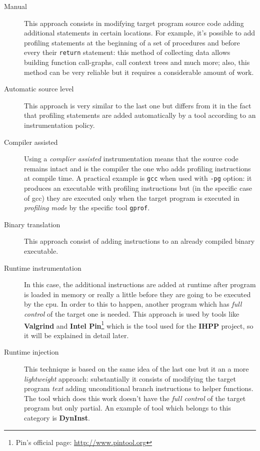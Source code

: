 \documentclass[a4paper,11pt]{report}
\begin{document}
\begin{description}
\begin{description}
\item[Manual]
This approach consists in modifying target program source code adding additional
statements in certain locations. For example, it's possible to add profiling
statements at the beginning of a set of procedures and before every their
\verb|return| statement: this method of collecting data allows building function
call-graphs, call context trees and much more; also, this method can be very
reliable but it requires a considerable amount of work.

\item[Automatic source level] This approach is very similar to the last one but
differs from it in the fact that profiling statements are added automatically by
a tool according to an instrumentation policy.

\item[Compiler assisted] Using a \emph{complier assisted} instrumentation means
that the source code remains intact and is the compiler the one who adds
profiling instructions at compile time. A practical example is \verb|gcc| when
used with \verb|-pg| option: it produces an executable with profiling
instructions but (in the specific case of gcc) they are executed only when the
target program is executed in \emph{profiling mode} by the specific tool
\verb|gprof|.

\item[Binary translation]
This approach consist of adding instructions to an already compiled binary executable.

\item[Runtime instrumentation]
In this case, the additional instructions are added at runtime after program is
loaded in memory or really a little before they are going to be executed by the
cpu. In order to this to happen, another program which has \emph{full control}
of the target one is needed. This approach is used by tools like
\textbf{Valgrind} and \textbf{Intel Pin}\footnote{Pin's official page:
\url{http://www.pintool.org}} which is the tool used for the \textbf{IHPP}
project, so it will be explained in detail later.

\item[Runtime injection] This technique is based on the same idea of the last
one but it an a more \emph{lightweight} approach: substantially it consists of
modifying the target program \emph{text} adding unconditional branch
instructions to helper functions. The tool which does this work doesn't have the
\emph{full control} of the target program but only partial. An example of tool
which belongs to this category is \textbf{DynInst}.


\end{description}
\end{description}
\end{document}
